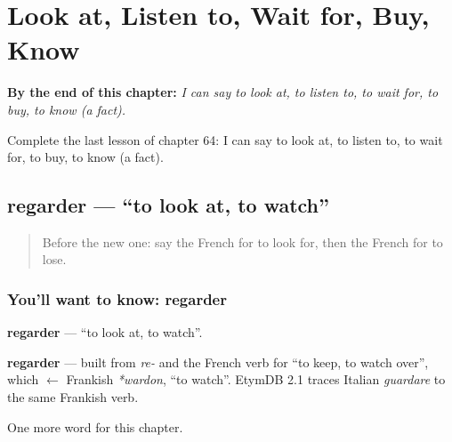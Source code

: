 
\chapter{Look at, Listen to, Wait for, Buy, Know}
\label{ch:fr-look-at-listen-to-wait-for-buy-know}

\begin{chapteropening}
\textbf{By the end of this chapter:} \emph{I can say to look at, to listen to, to wait for, to buy, to know (a fact).}

Complete the last lesson of chapter 64: I can say to look at, to listen to, to wait for, to buy, to know (a fact).
\end{chapteropening}

\section[regarder]{regarder — \textquotedblleft{}to look at, to watch\textquotedblright{}}

\label{lesson:FR-C64-regarder}



\begin{quote}
Before the new one: say the French for to look for, then the French for to lose.
\end{quote}

\subsection*{You'll want to know: regarder}
\textbf{regarder} — \textquotedblleft{}to look at, to watch\textquotedblright{}.

\begin{cousinweb}
\textbf{regarder} — built from \emph{re-} and the French verb for \textquotedblleft{}to keep, to watch over\textquotedblright{}, which $\leftarrow$ Frankish \emph{*wardon}, \textquotedblleft{}to watch\textquotedblright{}. EtymDB 2.1 traces Italian \emph{guardare} to the same Frankish verb.
\end{cousinweb}

\begin{grammarlens}[title={What you've built}]
One more word for this chapter.
\end{grammarlens}

